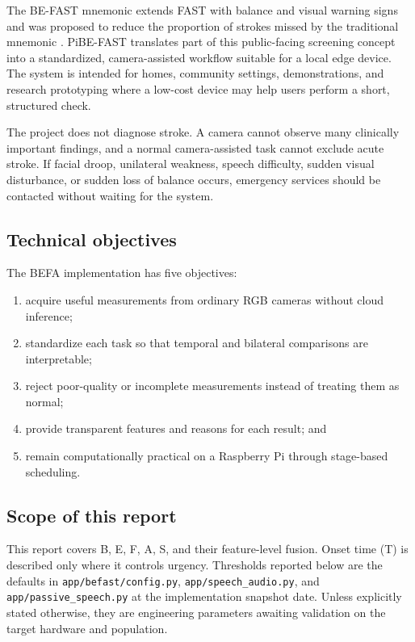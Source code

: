 \documentclass[11pt,a4paper]{article}
\begin{document}
The BE-FAST mnemonic extends FAST with balance and visual warning signs and was proposed to reduce the proportion of strokes missed by the traditional mnemonic \cite{aroor2017befast}. PiBE-FAST translates part of this public-facing screening concept into a standardized, camera-assisted workflow suitable for a local edge device. The system is intended for homes, community settings, demonstrations, and research prototyping where a low-cost device may help users perform a short, structured check.

The project does not diagnose stroke. A camera cannot observe many clinically important findings, and a normal camera-assisted task cannot exclude acute stroke. If facial droop, unilateral weakness, speech difficulty, sudden visual disturbance, or sudden loss of balance occurs, emergency services should be contacted without waiting for the system.

\subsection{Technical objectives}

The BEFA implementation has five objectives:

\begin{enumerate}
  \item acquire useful measurements from ordinary RGB cameras without cloud inference;
  \item standardize each task so that temporal and bilateral comparisons are interpretable;
  \item reject poor-quality or incomplete measurements instead of treating them as normal;
  \item provide transparent features and reasons for each result; and
  \item remain computationally practical on a Raspberry Pi through stage-based scheduling.
\end{enumerate}

\subsection{Scope of this report}

This report covers B, E, F, A, S, and their feature-level fusion. Onset time (T) is described only where it controls urgency. Thresholds reported below are the defaults in \texttt{app/befast/config.py}, \texttt{app/speech\_audio.py}, and \texttt{app/passive\_speech.py} at the implementation snapshot date. Unless explicitly stated otherwise, they are engineering parameters awaiting validation on the target hardware and population.
\end{document}

